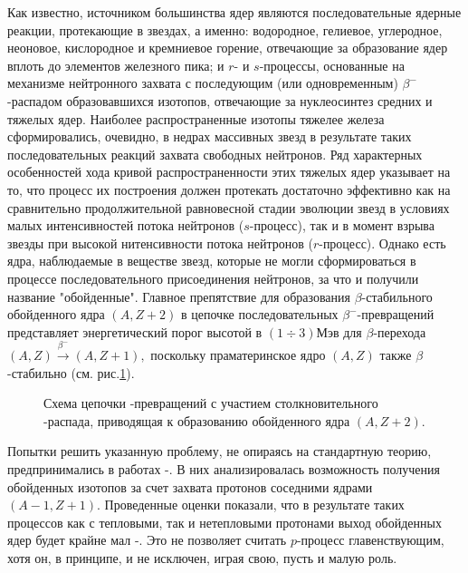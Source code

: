 Как известно, источником большинства ядер  являются последовательные
ядерные реакции, протекающие в звездах, а именно: водородное, гелиевое,
углеродное, неоновое, кислородное и кремниевое горение,
отвечающие за образование ядер вплоть до элементов железного пика;
и $r$- и  $s$-процессы, основанные на механизме нейтронного захвата
с последующим (или одновременным) $\beta^-$-распадом образовавшихся изотопов,
отвечающие за нуклеосинтез средних и тяжелых ядер.
Наиболее распространенные изотопы тяжелее железа сформировались, очевидно, в
недрах массивных звезд в результате таких последовательных реакций захвата
свободных нейтронов. Ряд характерных особенностей хода кривой
распространенности этих тяжелых ядер указывает на то, что процесс их
построения должен протекать достаточно эффективно как на сравнительно
продолжительной равновесной стадии эволюции звезд в условиях малых
интенсивностей потока нейтронов ($s$-процесс), так и в момент взрыва звезды
при высокой нитенсивности потока нейтронов ($r$-процесс).
Однако есть ядра, наблюдаемые в веществе звезд,
которые не могли сформироваться в процессе последовательного присоединения
нейтронов, за что и получили название "обойденные".
Главное препятствие для
образования $\beta$-стабильного обойденного ядра $(A,Z+2)$ в цепочке
последовательных $\beta^-$-превращений представляет энергетический порог
высотой в $(1\div 3) Мэв$ для $\beta$-перехода
$(A,Z)\stackrel{\beta^-}{\longrightarrow} (A,Z+1),$
поскольку праматеринское ядро $(A,Z)$ также $\beta$-стабильно (см. рис.\ref{SH}).

\begin{figure}
\vspace{18 true cm}
\caption{{
Схема цепочки \be-превращений с участием столкновительного \be-распада,
приводящая к образованию обойденного ядра $(A,Z+2)$.}}
\label{SH}
\end{figure}


Попытки решить указанную проблему, не опираясь на стандартную теорию,
предпринимались в работах
\cite{burbidge}-\cite{frank}.
В них анализировалась возможность получения обойденных изотопов за счет захвата протонов соседними ядрами $(A-1,Z+1)$.
Проведенные оценки показали, что в результате таких процессов как с тепловыми, так и нетепловыми протонами выход
обойденных ядер будет крайне мал \cite{burbidge}-\cite{frank}. Это не позволяет считать $p$-процесс главенствующим, хотя
он, в принципе, и не исключен, играя свою, пусть и малую роль.

